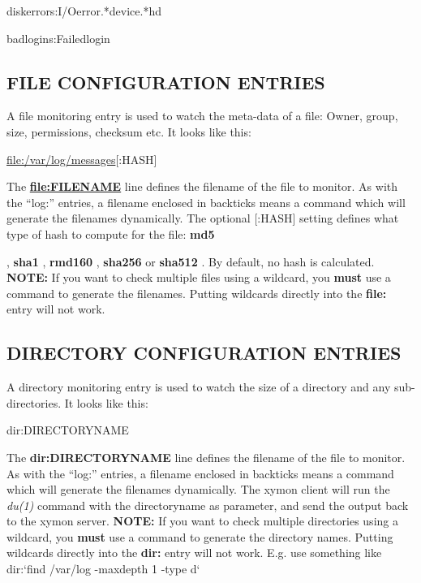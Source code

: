 diskerrors:I/Oerror.*device.*hd  
 
badlogins:Failedlogin 


 


 
\subsection{FILE CONFIGURATION ENTRIES}
 A file monitoring entry is used to watch the meta-data of a file:
 Owner, group, size, permissions, checksum etc. It looks like this: 


  
\url{file:/var/log/messages}[:HASH] 


  The \textbf{\url{file:FILENAME}}
 line defines the filename of the file to monitor. As with the
 ``log:'' entries, a filename enclosed in backticks means a command
 which will generate the filenames dynamically. The optional [:HASH]
 setting defines what type of hash to compute for the file:
 \textbf{md5}

, \textbf{sha1}
, \textbf{rmd160}
, \textbf{sha256}
 or \textbf{sha512}
. By default, no hash is calculated.  
\textbf{NOTE:}
 If you want to check multiple files using a wildcard, you \textbf{must}
 use a command to generate the filenames. Putting wildcards directly into the \textbf{file:}
 entry will not work. 


 
\subsection{DIRECTORY CONFIGURATION ENTRIES}
 A directory monitoring entry is used to watch the size of a directory and any sub-directories. It looks like this: 

  
dir:DIRECTORYNAME 


  The \textbf{dir:DIRECTORYNAME}
 line defines the filename of the file to monitor. As with the ``log:'' entries, a filename enclosed in backticks means a command which will generate the filenames dynamically. The xymon client will run the \emph{du(1)}
 command with the directoryname as parameter, and send the output back to the xymon server.  
\textbf{NOTE:}
 If you want to check multiple directories using a wildcard, you \textbf{must}
 use a command to generate the directory names. Putting wildcards directly into the \textbf{dir:}
 entry will not work. E.g. use something like  
dir:`find /var/log -maxdepth 1 -type d` 



